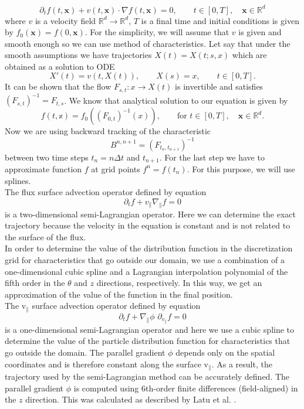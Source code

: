 \begin{equation}
    \partial_t f(t,\mathbf{x})+v(t,\mathbf{x})\cdot \nabla f(t,\mathbf{x})=0, \qquad t\in[0,T], \quad \mathbf{x}\in\mathbb{R}^d
\end{equation}
where $v$ is a velocity field $\mathbb{R}^d\longrightarrow\mathbb{R}^d$, $T$ is a final time and initial conditions is given by $f_0(\mathbf{x})=f(0,\mathbf{x})$. For the simplicity, we will assume that $v$ is given and smooth enough so we can use method of characteristics. Let say that under the smooth assumptions we have trajectories $X(t)=X(t;s,x)$ which are obtained as a solution to ODE
\begin{equation}
    X'(t)=v(t,X(t)), \qquad X(s)=x, \qquad t\in[0,T].
\end{equation}
It can be shown that the flow $F_{s,t}:x\longrightarrow X(t)$ is invertible and satisfies $(F_{s,t})^{-1}=F_{t,s}$. We know that analytical solution to our equation is given by
\begin{equation}
    f(t,\mathbb{x})=f_0((F_{0,t})^{-1}(x)),\qquad \text{for } t\in[0,T], \quad \mathbf{x}\in\mathbb{R}^d.
\end{equation}
Now we are using backward tracking of the characteristic
\begin{equation}
    B^{n,n+1}=(F_{t_n,t_{n+1}})^{-1}
\end{equation}
between two time steps $t_n=n\Delta t$ and $t_{n+1}$. For the last step we have to approximate function $f$ at grid points $f^n=f(t_n)$. For this purpose, we will use splines.\\
The flux surface advection operator defined by equation
\begin{equation}
 \partial_t f + v_\parallel \nabla_\parallel f = 0
\end{equation}
is a two-dimensional semi-Lagrangian operator. Here we can determine the exact trajectory because the velocity in the equation is constant and is not related to the surface of the flux.\\
In order to determine the value of the distribution function in the discretization grid for characteristics that go outside our domain, we use a combination of a one-dimensional cubic spline and a Lagrangian interpolation polynomial of the fifth order in the $\theta$ and $z$ directions, respectively. In this way, we get an approximation of the value of the function in the final position.\\
The v$_\parallel$ surface advection operator defined by equation
\begin{equation}
    \partial_t f + \nabla_\parallel \phi\,\, \partial_{v_{\parallel}} f = 0
\end{equation}
is a one-dimensional semi-Lagrangian operator and here we use a cubic spline to determine the value of the particle distribution function for characteristics that go outside the domain. The parallel gradient $\phi$ depends only on the spatial coordinates and is therefore constant along the surface v$_\parallel$. As a result, the trajectory used by the semi-Lagrangian method can be accurately defined. The parallel gradient $\phi$ is computed using 6th-order finite differences (field-aligned) in the $z$ direction. This was calculated as described by Latu et al. \cite{Latu_2017}.


